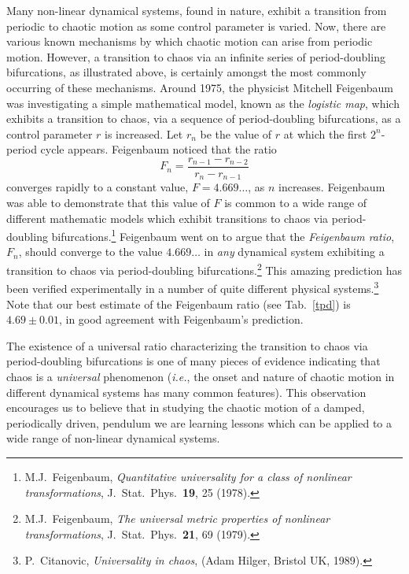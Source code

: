 Many non-linear dynamical systems, found in nature, exhibit a transition
from periodic to chaotic motion as some control parameter is varied.
Now, there are various known mechanisms by which chaotic motion can arise from periodic
motion. However, a transition to chaos via an infinite series of period-doubling bifurcations, as
illustrated
above, is certainly amongst the most commonly occurring of these mechanisms. 
Around 1975, the physicist Mitchell Feigenbaum was investigating a simple mathematical
model, known as the {\em logistic map}, which exhibits a transition to chaos,
via a sequence of period-doubling bifurcations, as a control parameter
$r$ is increased. Let $r_n$ be the value of $r$ at which the
first $2^n$-period cycle appears. Feigenbaum noticed that the ratio
\begin{equation}
F_n =\frac{r_{n-1}-r_{n-2}}{r_{n}-r_{n-1}}
\end{equation}
converges rapidly to a constant value, $F=4.669\ldots$, as $n$ increases. Feigenbaum was
able to demonstrate  that this value of $F$ is common to a wide range of different
mathematic models which exhibit transitions to chaos via period-doubling
bifurcations.\footnote{M.J.~Feigenbaum, {\em Quantitative universality for a
class of nonlinear transformations}, J.\ Stat.\ Phys.\ {\bf 19}, 25 (1978).}
Feigenbaum  went on to argue that the {\em Feigenbaum ratio}, $F_n$,
should converge to the value $4.669\ldots$ in {\em any} dynamical system exhibiting a
transition to chaos via period-doubling bifurcations.\footnote{M.J.~Feigenbaum, 
{\em The universal metric properties of nonlinear transformations}, 
J.\ Stat.\ Phys.\ {\bf 21}, 69 (1979).} This amazing prediction has
been verified experimentally in a number of quite different physical
systems.\footnote{P.~Citanovic, {\em Universality in chaos}, (Adam Hilger,
Bristol UK, 1989).} Note that our best estimate of the
Feigenbaum ratio (see Tab.~\ref{tpd}) is $4.69\pm 0.01$, in good agreement with Feigenbaum's
prediction.

The existence of a universal ratio characterizing the transition to chaos via
period-doubling bifurcations is one of many pieces of evidence indicating that
chaos is a {\em universal} phenomenon ({\em i.e.}, the onset and nature
of chaotic motion in different dynamical systems has many common features). 
This observation encourages us to believe that in studying the chaotic motion of 
a damped, periodically driven, pendulum we are  learning lessons which can
be applied to a wide range of non-linear dynamical systems.

